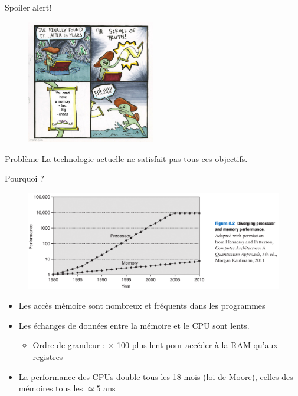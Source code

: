 \documentclass[10pt]{beamer}
\begin{document}
\begin{frame}{Spoiler alert!}
    \begin{figure}
        \centering
        \includegraphics[width=0.5\textwidth]{figures/meme.jpg}
        \label{fig:memory_speed}
    \end{figure}

    \begin{alertblock}{Problème}
        La technologie actuelle ne satisfait pas tous ces objectifs.
    \end{alertblock}
\end{frame}

\begin{frame}{Pourquoi ?}
    \begin{figure}[ht]
        \centering
        \centering
        \includegraphics[width=.75\linewidth]{figures/gap_cpu_ram_H.png}
        \label{fig:sub2}
    \end{figure}
    \begin{itemize}
        \item Les acc\`es mémoire sont nombreux et fréquents dans les
              programmes
        \item Les \'echanges de données entre la mémoire et le CPU sont lents.
              \begin{itemize}
                  \item Ordre de grandeur : $\times$ 100 plus lent pour accéder
                        à la RAM qu'aux registres
              \end{itemize}
        \item La performance des CPUs double tous les 18 mois (loi de Moore),
              celles des mémoires tous les $\simeq5$ ans
    \end{itemize}
\end{frame}
\end{document}
